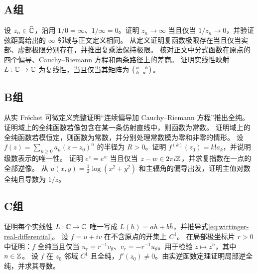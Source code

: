\subsection*{A组}
\begin{enumerate}[label=\textbf{\thechapter.\arabic*.}]
设 \(z_n\in\widehat{\mathbb{C}}\)，沿用 \(1/0=\infty\)、\(1/\infty=0\)。证明 \(z_n\to\infty\) 当且仅当 \(1/z_n\to0\)，并验证弦距离给出的 \(\infty\) 邻域与正文定义相同。
从定义证明复函数极限存在当且仅当实部、虚部极限分别存在，并推出复乘法保持极限。
核对正文中分式函数在原点的四个偏导、Cauchy--Riemann 方程和两条路径上的差商。
证明实线性映射 \(L:\mathbb{C}\to\mathbb{C}\) 为复线性，当且仅当其矩阵为 \(\begin{psmallmatrix}a&-b\\b&a\end{psmallmatrix}\)。
\end{enumerate}
\subsection*{B组}
\begin{enumerate}[label=\textbf{\thechapter.\arabic*.},resume]
从实 Fréchet 可微定义完整证明“连续偏导加 Cauchy--Riemann 方程”推出全纯。
证明域上的全纯函数若像包含在某一条仿射直线中，则函数为常数。
证明域上的全纯函数若模恒定，则函数为常数，并分别处理常数模为零和非零的情形。
设 \(f(z)=\sum_{n\ge0}a_n(z-z_0)^n\) 的半径为 \(R>0\)。证明 \(f^{(k)}(z_0)=k!a_k\)，并说明级数表示的唯一性。
证明 \(e^z=e^w\) 当且仅当 \(z-w\in2\pi i\mathbb{Z}\)，并求复指数在一点的全部逆像。
从 \(u(x,y)=\frac12\log(x^2+y^2)\) 和主辐角的偏导出发，证明主值对数全纯且导数为 \(1/z\)。
\end{enumerate}
\subsection*{C组}
\begin{enumerate}[label=\textbf{\thechapter.\arabic*.},resume]
证明每个实线性 \(L:\mathbb{C}\to\mathbb{C}\) 唯一写成 \(L(h)=ah+b\bar h\)，并推导式\eqref{eq:wirtinger-real-differential}。
设 \(f=u+iv\) 在不含原点的开集上 \(C^1\)。
在局部极坐标片 \(r>0\) 中证明：\(f\) 全纯当且仅当
\(u_r=r^{-1}v_\theta\)、\(v_r=-r^{-1}u_\theta\)。用于检验 \(z\mapsto z^n\)，其中 \(n\in\mathbb{Z}\)。
设 \(f\) 在 \(z_0\) 邻域 \(C^1\) 且全纯，\(f'(z_0)\ne0\)。由实逆函数定理证明局部逆全纯，并求其导数。
\end{enumerate}
